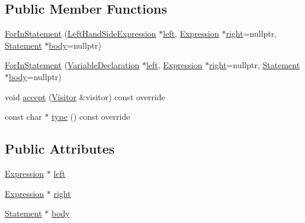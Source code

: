 \subsection*{Public Member Functions}
\begin{DoxyCompactItemize}
\item 
\hyperlink{struct_for_in_statement_aa3565db4851cca290147f4d98b275c68}{For\+In\+Statement} (\hyperlink{struct_left_hand_side_expression}{Left\+Hand\+Side\+Expression} $\ast$\hyperlink{struct_for_in_statement_acb865c777a9c3ccbe84ed09532f1a22f}{left}, \hyperlink{struct_expression}{Expression} $\ast$\hyperlink{struct_for_in_statement_a8aec27cbc19e2cb038acd3d0fc0a1969}{right}=nullptr, \hyperlink{struct_statement}{Statement} $\ast$\hyperlink{struct_for_in_statement_a865933063222b4eb53866423c444c1ca}{body}=nullptr)
\item 
\hyperlink{struct_for_in_statement_aa78680c185913cd46be68a67cbe43b27}{For\+In\+Statement} (\hyperlink{struct_variable_declaration}{Variable\+Declaration} $\ast$\hyperlink{struct_for_in_statement_acb865c777a9c3ccbe84ed09532f1a22f}{left}, \hyperlink{struct_expression}{Expression} $\ast$\hyperlink{struct_for_in_statement_a8aec27cbc19e2cb038acd3d0fc0a1969}{right}=nullptr, \hyperlink{struct_statement}{Statement} $\ast$\hyperlink{struct_for_in_statement_a865933063222b4eb53866423c444c1ca}{body}=nullptr)
\item 
void \hyperlink{struct_for_in_statement_ab5ee623aba6eebd12e52a9196e33e64b}{accept} (\hyperlink{struct_visitor}{Visitor} \&visitor) const override
\item 
const char $\ast$ \hyperlink{struct_for_in_statement_a5dd65175f49087b46e5e2f6d34246a1f}{type} () const override
\end{DoxyCompactItemize}
\subsection*{Public Attributes}
\begin{DoxyCompactItemize}
\item 
\hyperlink{struct_expression}{Expression} $\ast$ \hyperlink{struct_for_in_statement_acb865c777a9c3ccbe84ed09532f1a22f}{left}
\item 
\hyperlink{struct_expression}{Expression} $\ast$ \hyperlink{struct_for_in_statement_a8aec27cbc19e2cb038acd3d0fc0a1969}{right}
\item 
\hyperlink{struct_statement}{Statement} $\ast$ \hyperlink{struct_for_in_statement_a865933063222b4eb53866423c444c1ca}{body}
\end{DoxyCompactItemize}


